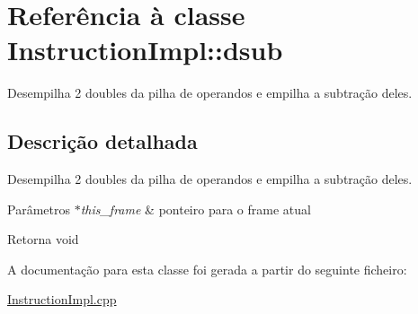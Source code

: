 \hypertarget{class_instruction_impl_1_1dsub}{}\section{Referência à classe Instruction\+Impl\+:\+:dsub}
\label{class_instruction_impl_1_1dsub}


Desempilha 2 doubles da pilha de operandos e empilha a subtração deles.  




\subsection{Descrição detalhada}
Desempilha 2 doubles da pilha de operandos e empilha a subtração deles. 


\begin{DoxyParams}{Parâmetros}
{\em $\ast$this\+\_\+frame} & ponteiro para o frame atual \\
\hline
\end{DoxyParams}
\begin{DoxyReturn}{Retorna}
void 
\end{DoxyReturn}


A documentação para esta classe foi gerada a partir do seguinte ficheiro\+:\begin{DoxyCompactItemize}
\item 
\hyperlink{_instruction_impl_8cpp}{Instruction\+Impl.\+cpp}\end{DoxyCompactItemize}
